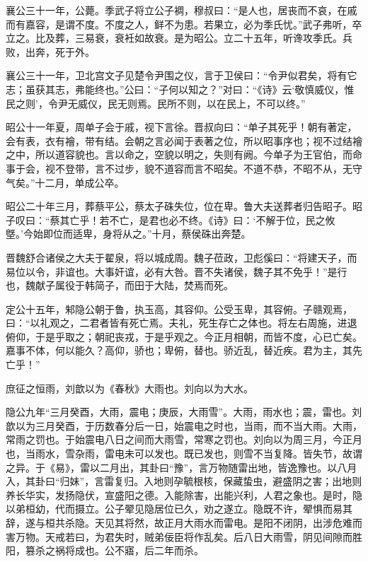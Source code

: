 \documentclass[12pt,UTF8]{ctexbook}
\begin{document}
襄公三十一年，公薨。季武子将立公子裯，穆叔曰：“是人也，居丧而不哀，在戚而有嘉容，是谓不度。不度之人，鲜不为患。若果立，必为季氏忧。”武子弗听，卒立之。比及葬，三易衰，衰衽如故衰。是为昭公。立二十五年，听谗攻季氏。兵败，出奔，死于外。



襄公三十一年，卫北宫文子见楚令尹围之仪，言于卫侯曰：“令尹似君矣，将有它志；虽获其志，弗能终也。”公曰：“子何以知之？”对曰：“《诗》云‘敬慎威仪，惟民之则’，令尹无威仪，民无则焉。民所不则，以在民上，不可以终。”



昭公十一年夏，周单子会于戚，视下言徐。晋叔向曰：“单子其死乎！朝有著定，会有表，衣有襘，带有结。会朝之言必闻于表著之位，所以昭事序也；视不过结襘之中，所以道容貌也。言以命之，空貌以明之，失则有阙。今单子为王官伯，而命事于会，视不登带，言不过步，貌不道容而言不昭矣。不道不恭，不昭不从，无守气矣。”十二月，单成公卒。



昭公二十年三月，葬蔡平公，蔡太子硃失位，位在卑。鲁大夫送葬者归告昭子。昭子叹曰：“蔡其亡乎！若不亡，是君也必不终。《诗》曰：‘不解于位，民之攸墍。’今始即位而适卑，身将从之。”十月，蔡侯硃出奔楚。



晋魏舒合诸侯之大夫于翟泉，将以城成周。魏子莅政，卫彪傒曰：“将建天子，而易位以令，非谊也。大事奸谊，必有大咎。晋不失诸侯，魏子其不免乎！”是行也，魏献子属役于韩简子，而田于大陆，焚焉而死。



定公十五年，邾隐公朝于鲁，执玉高，其容仰。公受玉卑，其容俯。子赣观焉，曰：“以礼观之，二君者皆有死亡焉。夫礼，死生存亡之体也。将左右周施，进退俯仰，于是乎取之；朝祀丧戎，于是乎观之。今正月相朝，而皆不度，心已亡矣。嘉事不体，何以能久？高仰，骄也；卑俯，替也。骄近乱，替近疾。君为主，其先亡乎！”



庶征之恒雨，刘歆以为《春秋》大雨也。刘向以为大水。



隐公九年“三月癸酉，大雨，震电；庚辰，大雨雪”。大雨，雨水也；震，雷也。刘歆以为三月癸酉，于历数春分后一日，始震电之时也，当雨，而不当大雨。大雨，常雨之罚也。于始震电八日之间而大雨雪，常寒之罚也。刘向以为周三月，今正月也，当雨水，雪杂雨，雷电未可以发也。既已发也，则雪不当复降。皆失节，故谓之异。于《易》，雷以二月出，其卦曰“豫”，言万物随雷出地，皆逸豫也。以八月入，其卦曰“归妹”，言雷复归。入地则孕毓根核，保藏蛰虫，避盛阴之害；出地则养长华实，发扬隐伏，宣盛阳之德。入能除害，出能兴利，人君之象也。是时，隐以弟桓幼，代而摄立。公子翚见隐居位已久，劝之遂立。隐既不许，翚惧而易其辞，遂与桓共杀隐。天见其将然，故正月大雨水而雷电。是阳不闭阴，出涉危难而害万物。天戒若曰，为君失时，贼弟佞臣将作乱矣。后八日大雨雪，阴见间隙而胜阳，篡杀之祸将成也。公不寤，后二年而杀。
\end{document}
